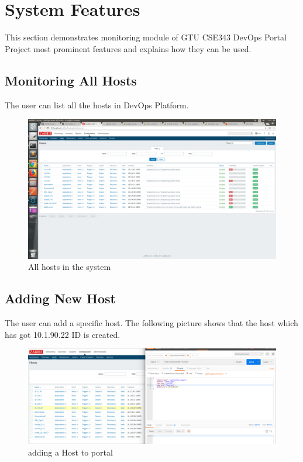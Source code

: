 \documentclass{article}
\begin{document}
\section{System Features}

This section demonstrates monitoring module of GTU CSE343 DevOps Portal Project most prominent features and explains how they can be used.


\subsection{Monitoring All Hosts}

The user  can list all the hosts in DevOps Platform. 

\begin{figure}[H]
\centering
\includegraphics[scale=0.3,width=\linewidth]{ilk_hali01}
\caption{All hosts in the system }
\end{figure}


\subsection{Adding New Host}

The user can add a specific host. The following picture shows that the host which has got 10.1.90.22 ID is created.

\begin{figure}[H]
\centering
\includegraphics[scale=0.3,width=\linewidth]{eklendi_ilk}
\caption{adding a Host to portal}
\end{figure}
\end{document}
